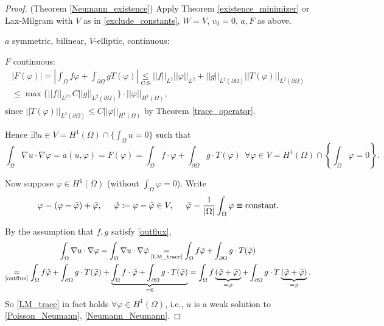 \documentclass[12pt]{article}
\theoremstyle{definition}
\begin{document}
\begin{proof}
(Theorem \ref{Neumann_existence}) Apply Theorem \ref{existence_minimizer} or Lax-Milgram with $V$ as in \eqref{exclude_constants}, $W=V$, $v_0=0$, $a,F$ as above.

$a$ symmetric, bilinear, $V$-elliptic, continuous: \checkmark

$F$ continuous:
\begin{multline*}
\big|F(\varphi)\big|=\left|\int_\Omega f\varphi+\int_{\partial\Omega}gT(\varphi)\right|\underset{\text{C-S}}\leq||f||_{L^2}||\varphi||_{L^2}+||g||_{L^2(\partial\Omega)}\big|\big|T(\varphi)\big|\big|_{L^2(\partial\Omega)}\\
\leq\max\big\{||f||_{L^2},C||g||_{L^2(\partial\Omega)}\big\}\cdot||\varphi||_{H^1(\Omega)},
\end{multline*}
since $||T(\varphi)||_{L^2(\partial\Omega)}\leq C||\varphi||_{H^1(\Omega)}$ by Theorem \ref{trace_operator}.

Hence $\exists!u\in V=H^1(\Omega)\cap\{\int_\Omega u=0\}$ such that
\begin{equation}\tag{W}\label{LM_trace}
\int_\Omega\nabla u\cdot\nabla\varphi=a(u,\varphi)=F(\varphi)=\int_\Omega f\cdot\varphi+\int_{\partial\Omega}g\cdot T(\varphi)\ \ \forall\varphi\in V=H^1(\Omega)\cap\left\{\int_\Omega\varphi=0\right\}.
\end{equation}

Now suppose $\varphi\in H^1(\Omega)$ (without $\int_\Omega\varphi=0$). Write
\[\varphi=(\varphi-\bar\varphi)+\bar\varphi,\hspace{5mm}\tilde\varphi\coloneqq\varphi-\bar\varphi\in V,\hspace{5mm}\bar\varphi=\frac1{|\Omega|}\int_\Omega\varphi\equiv\text{constant}.\]

By the assumption that $f,g$ satisfy \eqref{outflux},
\begin{multline*}
\int_\Omega\nabla u\cdot\nabla\varphi=\int_\Omega\nabla u\cdot\nabla\tilde\varphi\underset{\text{\eqref{LM_trace}}}=\int_\Omega f\tilde\varphi+\int_{\partial\Omega}g\cdot T(\tilde\varphi)\\
\underset{\text{\eqref{outflux}}}=\int_\Omega f\tilde\varphi+\int_{\partial\Omega}g\cdot T(\tilde\varphi)+\underbrace{\int_\Omega f\cdot\bar\varphi+\int_{\partial\Omega}g\cdot T(\bar\varphi)}_{=0}=\int_\Omega f\underbrace{(\tilde\varphi+\bar\varphi)}_{=\varphi}+\int_{\partial\Omega}g\cdot T\underbrace{(\tilde\varphi+\bar\varphi)}_{=\varphi}.
\end{multline*}
So \eqref{LM_trace} in fact holds $\forall\varphi\in H^1(\Omega)$, i.e., $u$ is a weak solution to \eqref{Poisson_Neumann}, \eqref{Neumann_Neumann}.
\end{proof}
\end{document}
